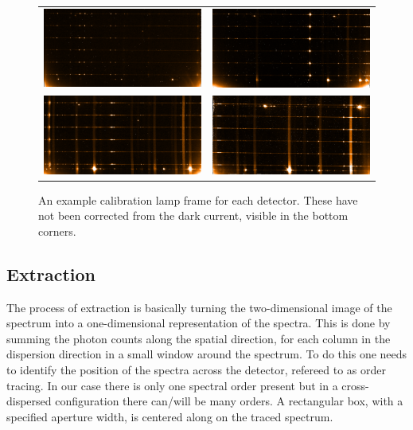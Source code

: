 \begin{figure}
    \begin{tabular}{cc}
         \includegraphics[width=.45\hsize]{./figures/reduction/Thar_1.png} & \includegraphics[width=.45\hsize]{./figures/reduction/Thar_2.png} \\
         \includegraphics[width=.45\hsize]{./figures/reduction/Thar_3.png} & \includegraphics[width=.45\hsize]{./figures/reduction/Thar_4.png} \\
    \end{tabular}

    \caption{An example \thar{} calibration lamp frame for each detector. These have not been corrected from the dark current, visible in the bottom corners.}
    \label{fig:caliblamps}
\end{figure}


\subsection{Extraction}
\label{subsec:extraction}
The process of extraction is basically turning the two-dimensional image of the spectrum into a one-dimensional representation of the spectra. This is done by summing the photon counts along the spatial direction, for each column in the dispersion direction in a small window around the spectrum. To do this one needs to identify the position of the spectra across the detector,  refereed to as {order tracing}. In our case there is only one spectral order present but in a cross-dispersed configuration there can/will be many orders. A rectangular box, with a specified aperture width, is centered along on the traced spectrum.

